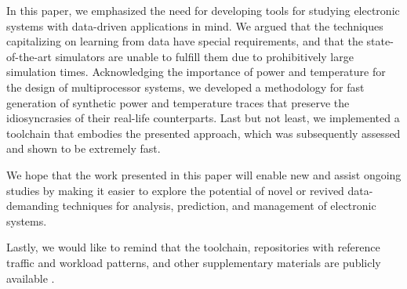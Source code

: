 In this paper, we emphasized the need for developing tools for studying
electronic systems with data-driven applications in mind. We argued that the
techniques capitalizing on learning from data have special requirements, and
that the state-of-the-art simulators are unable to fulfill them due to
prohibitively large simulation times. Acknowledging the importance of power and
temperature for the design of multiprocessor systems, we developed a methodology
for fast generation of synthetic power and temperature traces that preserve the
idiosyncrasies of their real-life counterparts. Last but not least, we
implemented a toolchain that embodies the presented approach, which was
subsequently assessed and shown to be extremely fast.

We hope that the work presented in this paper will enable new and assist ongoing
studies by making it easier to explore the potential of novel or revived
data-demanding techniques for analysis, prediction, and management of electronic
systems.

Lastly, we would like to remind that the toolchain, repositories with reference
traffic and workload patterns, and other supplementary materials are publicly
available \cite{sources}.

